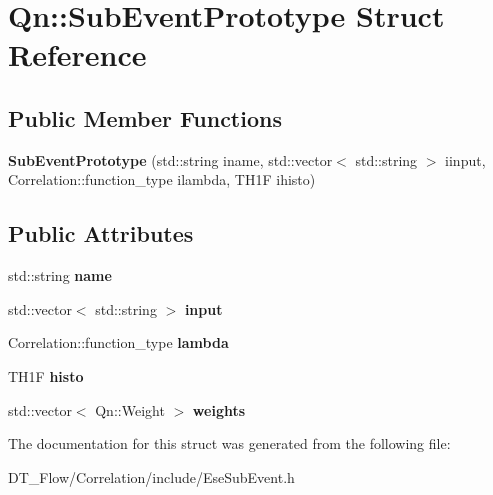\hypertarget{structQn_1_1SubEventPrototype}{}\section{Qn\+:\+:Sub\+Event\+Prototype Struct Reference}
\label{structQn_1_1SubEventPrototype}
\subsection*{Public Member Functions}
\begin{DoxyCompactItemize}
\item 
\mbox{\label{structQn_1_1SubEventPrototype_ab835e15daec69a1cffe28e7f04747415}} 
{\bfseries Sub\+Event\+Prototype} (std\+::string iname, std\+::vector$<$ std\+::string $>$ iinput, Correlation\+::function\+\_\+type ilambda, T\+H1F ihisto)
\end{DoxyCompactItemize}
\subsection*{Public Attributes}
\begin{DoxyCompactItemize}
\item 
\mbox{\label{structQn_1_1SubEventPrototype_a42e127365a4012d9a3a6bdb87a395f4a}} 
std\+::string {\bfseries name}
\item 
\mbox{\label{structQn_1_1SubEventPrototype_a938fca98137d68c5c8accae0812d7de2}} 
std\+::vector$<$ std\+::string $>$ {\bfseries input}
\item 
\mbox{\label{structQn_1_1SubEventPrototype_a0e13f135b1f34b98b2943bc0ea555fac}} 
Correlation\+::function\+\_\+type {\bfseries lambda}
\item 
\mbox{\label{structQn_1_1SubEventPrototype_acb0402fbd4879d8a54ac9e24fba480cc}} 
T\+H1F {\bfseries histo}
\item 
\mbox{\label{structQn_1_1SubEventPrototype_a50febb4c61a76fc6eed12356a65765de}} 
std\+::vector$<$ Qn\+::\+Weight $>$ {\bfseries weights}
\end{DoxyCompactItemize}


The documentation for this struct was generated from the following file\+:\begin{DoxyCompactItemize}
\item 
D\+T\+\_\+\+Flow/\+Correlation/include/Ese\+Sub\+Event.\+h\end{DoxyCompactItemize}

